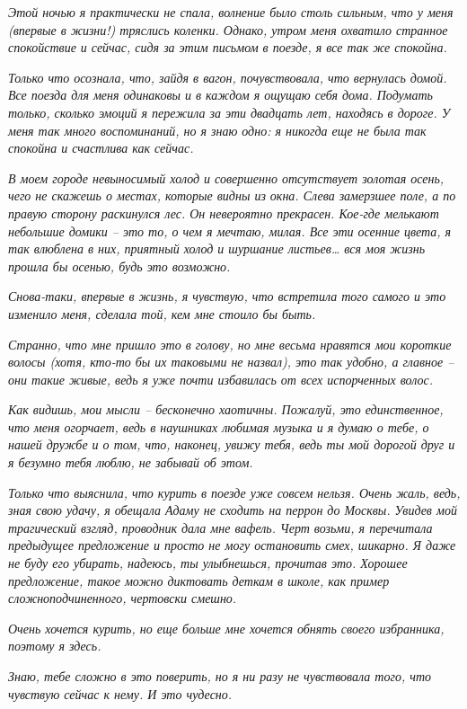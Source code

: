 \documentclass[
]{book}
\begin{document}
\emph{Этой ночью я практически не спала, волнение было столь сильным, что у меня (впервые в жизни!) тряслись коленки. Однако, утром меня охватило странное спокойствие и сейчас, сидя за этим письмом в поезде, я все так же спокойна.}

\emph{Только что осознала, что, зайдя в вагон, почувствовала, что вернулась домой. Все поезда для меня одинаковы и в каждом я ощущаю себя дома. Подумать только, сколько эмоций я пережила за эти двадцать лет, находясь в дороге. У меня так много воспоминаний, но я знаю одно: я никогда еще не была так спокойна и счастлива как сейчас.}

\emph{В моем городе невыносимый холод и совершенно отсутствует золотая осень, чего не скажешь о местах, которые видны из окна. Слева замерзшее поле, а по правую сторону раскинулся лес. Он невероятно прекрасен. Кое-где мелькают небольшие домики -- это то, о чем я мечтаю, милая. Все эти осенние цвета, я так влюблена в них, приятный холод и шуршание листьев\ldots{} вся моя жизнь прошла бы осенью, будь это возможно. }

\emph{Снова-таки, впервые в жизнь, я чувствую, что встретила того самого и это изменило меня, сделала той, кем мне стоило бы быть. }

\emph{Странно, что мне пришло это в голову, но мне весьма нравятся мои короткие волосы (хотя, кто-то бы их таковыми не назвал), это так удобно, а главное -- они такие живые, ведь я уже почти избавилась от всех испорченных волос. }

\emph{Как видишь, мои мысли -- бесконечно хаотичны. Пожалуй, это единственное, что меня огорчает, ведь в наушниках любимая музыка и я думаю о тебе, о нашей дружбе и о том, что, наконец, увижу тебя, ведь ты мой дорогой друг и я безумно тебя люблю, не забывай об этом.}

\emph{Только что выяснила, что курить в поезде уже совсем нельзя. Очень жаль, ведь, зная свою удачу, я обещала Адаму не сходить на перрон до Москвы. Увидев мой трагический взгляд, проводник дала мне вафель. Черт возьми, я перечитала предыдущее предложение и просто не могу остановить смех, шикарно. Я даже не буду его убирать, надеюсь, ты улыбнешься, прочитав это. Хорошее предложение, такое можно диктовать деткам в школе, как пример сложноподчиненного, чертовски смешно. }

\emph{Очень хочется курить, но еще больше мне хочется обнять своего избранника, поэтому я здесь.}

\emph{Знаю, тебе сложно в это поверить, но я ни разу не чувствовала того, что чувствую сейчас к нему. И это чудесно. }
\end{document}

